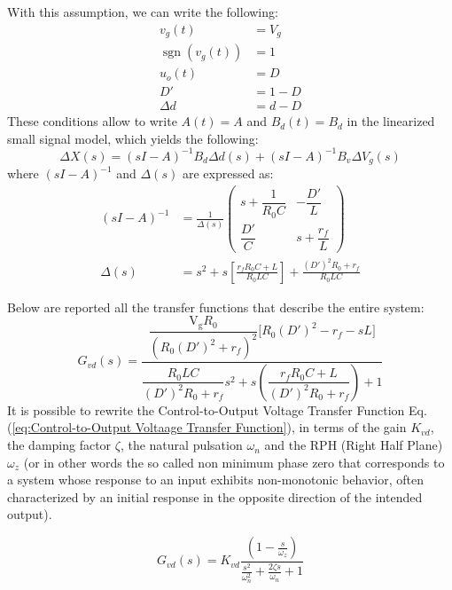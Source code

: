 \documentclass[DIV=calc, paper=a4, fontsize=11pt, twocolumn]{scrartcl}	 %
\begin{document}
With this assumption, we can write the following:
\begin{align*}
v_g(t) &= V_g \\
\operatorname{sgn}(v_g(t))&=1 \\
u_o(t) &= D\\
D'&=1-D\\
\Delta{d} &= d - D
\end{align*}
These conditions allow to write $A(t) = A$ and $B_d(t) = B_d$ in the linearized small signal model, which yields the following:
{\small
\begin{equation}
\Delta{X}(s) = (sI - A)^{-1} B_d \Delta{d}(s) + (sI - A)^{-1} B_v \Delta{V}_g(s)
\end{equation}
}
where $(sI-A)^{-1}$ and $\Delta(s)$ are expressed as:
{\small
\begin{equation}
\begin{aligned}
(sI - A)^{-1} &= \frac{1}{\Delta(s)}
\begin{pmatrix} 
s + \dfrac{1}{R_0 C} & -\dfrac{D'}{L} \\[12pt] 
\dfrac{D'}{C} & s + \dfrac{r_f}{L} 
\end{pmatrix} \\[20pt]
\Delta(s) &= s^2 + s \left[ \frac{r_f R_0 C + L}{R_0 L C} \right] + \frac{(D')^2 R_0 + r_f}{R_0 L C}
\end{aligned}
\end{equation}
}

{\small
Below are reported all the transfer functions that describe the entire system:
\begin{equation}\label{eq:Control-to-Output Voltaage Transfer Function}
G_{vd}(s) = \frac{\dfrac{\mathrm{V_g} R_0}{(R_0 (D')^2 + r_f)^2} \Big[ R_0 (D')^2 - r_f - sL \Big]}{\dfrac{R_0 LC}{(D')^2 R_0 + r_f} s^2 + s \left( \dfrac{r_f R_0 C + L}{(D')^2 R_0 + r_f} \right) + 1}
\end{equation}
}
It is possible to rewrite the Control-to-Output Voltage Transfer Function Eq. (\ref{eq:Control-to-Output Voltaage Transfer Function}), in terms of the gain $K_{vd}$, the damping factor $\zeta$,  the natural pulsation $\omega_n$ and the RPH (Right Half Plane) $\omega_z$ (or in other words the so called non minimum phase zero that corresponds to a system whose response to an input exhibits non-monotonic behavior, often characterized by an initial response in the opposite direction of the intended output).

\begin{equation}
G_{vd}(s) = K_{vd} \frac{\left( 1 - \frac{s}{\omega_z} \right)}{\frac{s^2}{\omega_n^2} + \frac{2\zeta s}{\omega_n} + 1}
\end{equation}
\end{document}
